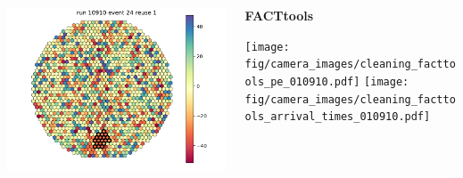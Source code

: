 \begin{withoutheadline}
\begin{frame}{}
\begin{columns}[onlytextwidth]
\begin{column}{0.33\textwidth}
        \includegraphics[width=\textwidth, page=22]{fig/camera_images/cleaning_thresh_arrival_times_010910.pdf}
      \end{column}
    \hfill%
      \begin{column}{0.33\textwidth}
          \centering
        \textbf{FACTtools}\par\medskip
        \texttt{[image: fig/camera\_images/cleaning\_facttools\_pe\_010910.pdf]}
        \texttt{[image: fig/camera\_images/cleaning\_facttools\_arrival\_times\_010910.pdf]}
      \end{column}
    \end{columns}
  \end{frame}
\end{withoutheadline}

